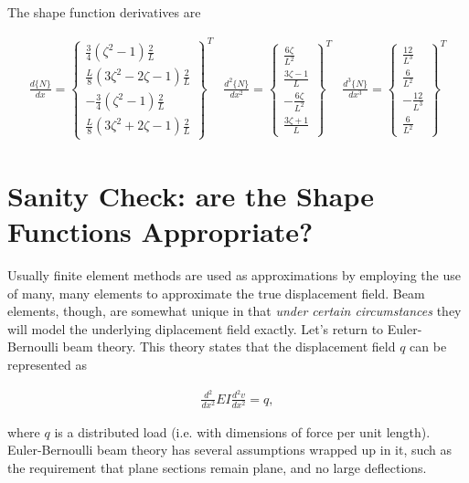 \documentclass[10pt,letterpaper]{article}
\begin{document}
	The shape function derivatives are

	\begin{align}
		\frac{d \{N\}}{d x}     =
		\begin{Bmatrix}
				\frac{3}{4} (\zeta^2-1) \frac{2}{L} \\
				\frac{L}{8} (3 \zeta^2-2 \zeta - 1) \frac{2}{L} \\
			   -\frac{3}{4} (\zeta^2-1) \frac{2}{L} \\
				\frac{L}{8} (3 \zeta^2+2 \zeta -1) \frac{2}{L}
		\end{Bmatrix}^T &
		\frac{d^2 \{N\}}{d x^2} =
		\begin{Bmatrix}
				\frac{6 \zeta}{L^2} \\
				\frac{3 \zeta-1}{L} \\
			   -\frac{6 \zeta}{L^2} \\
				\frac{3 \zeta+1}{L}
		\end{Bmatrix}^T &
		\frac{d^3 \{N\}}{d x^3} =
		\begin{Bmatrix}
				\frac{12}{L^3} \\
				\frac{6}{L^2} \\
			   -\frac{12}{L^3} \\
				\frac{6}{L^2}
		\end{Bmatrix}^T 
	\end{align}

	\newpage
	\section{Sanity Check: are the Shape Functions Appropriate?}

	Usually finite element methods are used as approximations by employing the use of many, many elements to approximate the true displacement field. Beam elements, though, are somewhat unique in that \textit{under certain circumstances} they will model the underlying diplacement field exactly. Let's return to Euler-Bernoulli beam theory. This theory states that the displacement field $q$ can be represented as 

	\begin{align}
		\frac{d^2}{d x^2} E I \frac{d^2 v}{d x^2} = q ,
	\end{align}

	where $q$ is a distributed load (i.e. with dimensions of force per unit length). Euler-Bernoulli beam theory has several assumptions wrapped up in it, such as the requirement that plane sections remain plane, and no large deflections.
\end{document}
